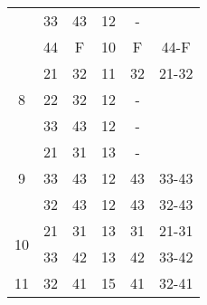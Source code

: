 \begin{tabular}{cccccc}
       & 33     & 43     & 12     & -      &  \\
       & 44     & F      & 10     & F      & 44-F \bigstrut[b]\\
\hline
\multirow{3}[2]{*}{8} & 21     & 32     & 11     & 32     & 21-32 \bigstrut[t]\\
       & 22     & 32     & 12     & -      &  \\
       & 33     & 43     & 12     & -      &  \bigstrut[b]\\
\hline
\multirow{3}[2]{*}{9} & 21     & 31     & 13     & -      &  \bigstrut[t]\\
       & 33     & 43     & 12     & 43     & 33-43 \\
       & 32     & 43     & 12     & 43     & 32-43 \bigstrut[b]\\
\hline
\multirow{2}[2]{*}{10} & 21     & 31     & 13     & 31     & 21-31 \bigstrut[t]\\
       & 33     & 42     & 13     & 42     & 33-42 \bigstrut[b]\\
\hline
11     & 32     & 41     & 15     & 41     & 32-41 \bigstrut\\
\hline
\hline
\end{tabular}%
